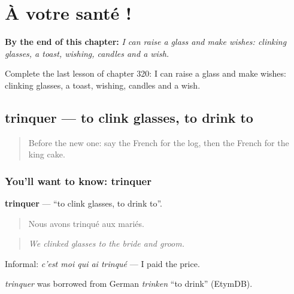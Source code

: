 
\chapter{À votre santé !}
\label{ch:fr-a-votre-sante}

\begin{chapteropening}
\textbf{By the end of this chapter:} \emph{I can raise a glass and make wishes: clinking glasses, a toast, wishing, candles and a wish.}

Complete the last lesson of chapter 320: I can raise a glass and make wishes: clinking glasses, a toast, wishing, candles and a wish.
\end{chapteropening}

\section[trinquer]{trinquer — to clink glasses, to drink to}

\label{lesson:FR-C320-trinquer}



\begin{quote}
Before the new one: say the French for the log, then the French for the king cake.
\end{quote}

\subsection*{You'll want to know: trinquer}
\textbf{trinquer} — \textquotedblleft{}to clink glasses, to drink to\textquotedblright{}.

\begin{quote}
Nous avons trinqué aux mariés.
\end{quote}

\begin{quote}
\emph{We clinked glasses to the bride and groom.}
\end{quote}

Informal: \emph{c'est moi qui ai trinqué} — I paid the price.

\begin{cousinweb}
\emph{trinquer} was borrowed from German \emph{trinken} \textquotedblleft{}to drink\textquotedblright{} (EtymDB).
\end{cousinweb}

